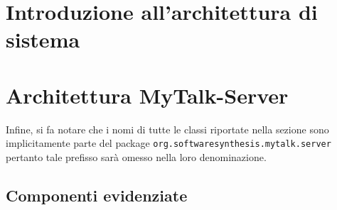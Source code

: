 \section{Introduzione all'architettura di sistema}
\clearpage

\section{Architettura MyTalk-Server}
Infine, si fa notare che i nomi di tutte le classi riportate nella sezione sono implicitamente parte del package \texttt{org.softwaresynthesis.mytalk.server} pertanto tale prefisso sarà omesso nella loro denominazione.

\subsection{Componenti evidenziate}

